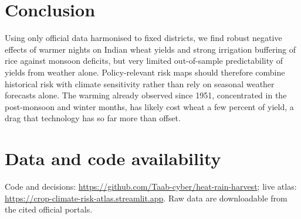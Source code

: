 \documentclass[conference]{IEEEtran}
\begin{document}
\section{Conclusion}
Using only official data harmonised to fixed districts, we find robust negative effects of warmer nights on Indian
wheat yields and strong irrigation buffering of rice against monsoon deficits, but very limited out-of-sample
predictability of yields from weather alone. Policy-relevant risk maps should therefore combine historical risk with
climate sensitivity rather than rely on seasonal weather forecasts alone. The warming already observed since 1951,
concentrated in the post-monsoon and winter months, has likely cost wheat a few percent of yield, a drag that
technology has so far more than offset.

\section*{Data and code availability}
Code and decisions: \url{https://github.com/Taab-cyber/heat-rain-harvest}; live atlas:
\url{https://crop-climate-risk-atlas.streamlit.app}. Raw data are downloadable from the
cited official portals.



\end{document}
